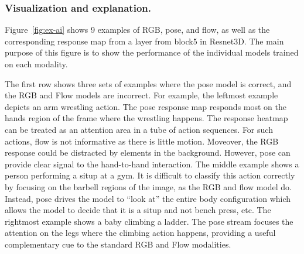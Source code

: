 \documentclass[letterpaper]{article} \usepackage{aaai21}  \usepackage{times}  \usepackage{helvet} \usepackage{courier}  \usepackage[hyphens]{url}  \usepackage{graphicx} \urlstyle{rm} \def\UrlFont{\rm}  \usepackage{natbib}  \usepackage{caption} \frenchspacing  \setlength{\pdfpagewidth}{8.5in}  \setlength{\pdfpageheight}{11in}
\begin{document}
\begin{table}[t!]
\setlength{\extrarowheight}{1pt}
\centering
\caption{\footnotesize Results on Kinetics-600 distillation. SL stands for separate loss, and UL stands for unified loss.}
\label{tab:main}
\vspace{-0.4cm}
\end{table}


\subsubsection{Visualization and explanation.} Figure~\ref{fig:ex-ai} shows 9 examples of RGB, pose, and flow, as well as the corresponding response map from a layer from block5 in Resnet3D. The main purpose of this figure is to show the performance of the individual models trained on each modality. 


The first row shows three sets of examples where the pose model is correct, and the RGB and Flow models are incorrect. For example, the leftmost example depicts an arm wrestling action. The pose response map responds most on the hands region of the frame where the wrestling happens. The response heatmap can be treated as an attention area in a tube of action sequences. For such actions, flow is not informative as there is little motion. Moveover, the RGB response could be distracted by elements in the background. However, pose can provide clear signal to the hand-to-hand interaction. The middle example shows a person performing a situp at a gym. It is difficult to classify this action correctly by focusing on the barbell regions of the image, as the RGB and flow model do. Instead, pose drives the model to ``look at'' the entire body configuration which allows the model to decide that it is a situp and not bench press, etc. The rightmost example shows a baby climbing a ladder. The pose stream focuses the attention on the legs where the climbing action happens, providing a useful complementary cue to the standard RGB and Flow modalities.
\end{document}
